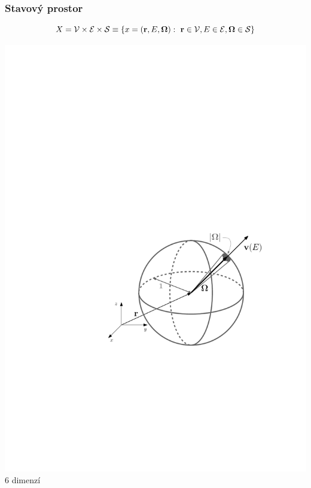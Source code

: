 \begin{frame}[t]
  \frametitle{Stavový prostor}
 
  $$
    X = \mathcal{V} \times \mathcal{E} \times \mathcal{S} \equiv \{x = (\mathbf{r},E,\mathbf{\Omega}):\ \mathbf{r}\in \mathcal{V}, E \in \mathcal{E}, \mathbf{\Omega}\in \mathcal{S}\}
  $$
  
  \begin{center}
	\includegraphics[scale=0.70]{obr/stavovy_prostor}\\[1em]
	\alert{6 dimenzí}
  \end{center}

\end{frame}

